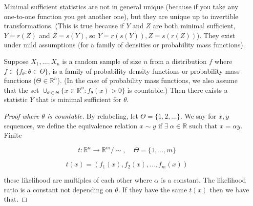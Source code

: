 \begin{remark} Minimal sufficient statistics are not in general unique (because if you take any one-to-one function you get another one), but they are unique up to invertible transformations. (This is true because if \(Y\) and \(Z\) are both minimal sufficient, \(Y = r(Z)\) and \( Z = s(Y)\), so \(Y = r(s(Y)), Z = s(r(Z))\)). They exist under mild assumptions (for a family of densities or probability mass functions).

\end{remark}

\begin{proposition}\label{mathstats.prop.5.12} Suppose \(X_1, \ldots, X_n\) is a random sample of size \(n\) from a distribution \(f\) where \(f \in \{f_\theta: \theta \in \Theta\}\), is a family of probability density functions or probability mass functions (\(\Theta \in \mathbb{R}^n\)). (In the case of probability mass functions, we also assume that the set \(\cup_{\theta \in \Theta} \{x \in \mathbb{R}^n: f_\theta(x) > 0\}\) is countable.) Then there exists a statistic \(Y\) that is minimal sufficient for \(\theta\).

\end{proposition}

\begin{proof}[Proof where \(\theta\) is countable] By relabeling, let \(\Theta = \{1, 2, \ldots\}\). We say for \(x, y \) sequences, we define the equivalence relation \(x \sim y \text{ if } \exists \ \alpha \in \mathbb{R} \text{ such that } x = \alpha y\). Finite

\[
t: \mathbb{R}^n \to \mathbb{R}^m/\sim, \ \ \ \ \ \Theta = \{1, \ldots, m\}
\]

\[
t(x) = (f_1(x), f_2(x), \ldots, f_m(x))
\]

these likelihood are multiples of each other where \(\alpha\) is a constant. The likelihood ratio is a constant not depending on \(\theta\). If they have the same \(t(x)\) then we have that.

\end{proof}


